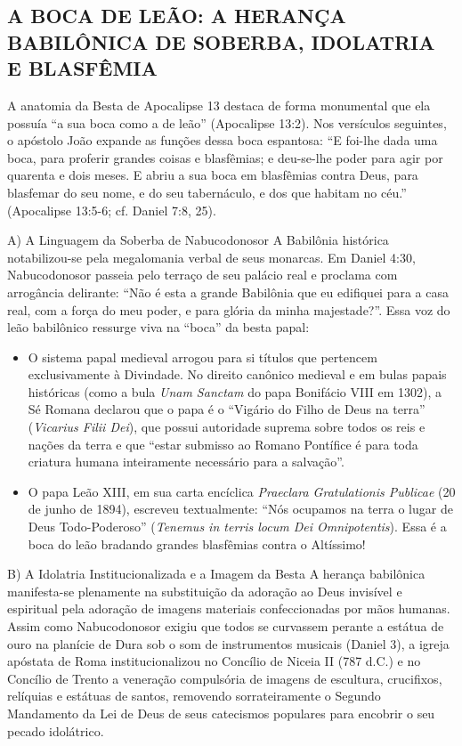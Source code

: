 \subsection{A BOCA DE LEÃO: A HERANÇA BABILÔNICA DE SOBERBA, IDOLATRIA E BLASFÊMIA}


A anatomia da Besta de Apocalipse 13 destaca de forma monumental que ela possuía ``a sua boca como a de leão'' (Apocalipse 13:2). Nos versículos seguintes, o apóstolo João expande as funções dessa boca espantosa:
``E foi-lhe dada uma boca, para proferir grandes coisas e blasfêmias; e deu-se-lhe poder para agir por quarenta e dois meses. E abriu a sua boca em blasfêmias contra Deus, para blasfemar do seu nome, e do seu tabernáculo, e dos que habitam no céu.'' (Apocalipse 13:5-6; cf. Daniel 7:8, 25).

A) A Linguagem da Soberba de Nabucodonosor
A Babilônia histórica notabilizou-se pela megalomania verbal de seus monarcas. Em Daniel 4:30, Nabucodonosor passeia pelo terraço de seu palácio real e proclama com arrogância delirante: ``Não é esta a grande Babilônia que eu edifiquei para a casa real, com a força do meu poder, e para glória da minha majestade?''. Essa voz do leão babilônico ressurge viva na ``boca'' da besta papal:
\begin{itemize}
  \item O sistema papal medieval arrogou para si títulos que pertencem exclusivamente à Divindade. No direito canônico medieval e em bulas papais históricas (como a bula \textit{Unam Sanctam} do papa Bonifácio VIII em 1302), a Sé Romana declarou que o papa é o ``Vigário do Filho de Deus na terra'' (\textit{Vicarius Filii Dei}), que possui autoridade suprema sobre todos os reis e nações da terra e que ``estar submisso ao Romano Pontífice é para toda criatura humana inteiramente necessário para a salvação''.
  \item O papa Leão XIII, em sua carta encíclica \textit{Praeclara Gratulationis Publicae} (20 de junho de 1894), escreveu textualmente: ``Nós ocupamos na terra o lugar de Deus Todo-Poderoso'' (\textit{Tenemus in terris locum Dei Omnipotentis}). Essa é a boca do leão bradando grandes blasfêmias contra o Altíssimo!
\end{itemize}


B) A Idolatria Institucionalizada e a Imagem da Besta
A herança babilônica manifesta-se plenamente na substituição da adoração ao Deus invisível e espiritual pela adoração de imagens materiais confeccionadas por mãos humanas. Assim como Nabucodonosor exigiu que todos se curvassem perante a estátua de ouro na planície de Dura sob o som de instrumentos musicais (Daniel 3), a igreja apóstata de Roma institucionalizou no Concílio de Niceia II (787 d.C.) e no Concílio de Trento a veneração compulsória de imagens de escultura, crucifixos, relíquias e estátuas de santos, removendo sorrateiramente o Segundo Mandamento da Lei de Deus de seus catecismos populares para encobrir o seu pecado idolátrico.

